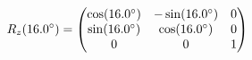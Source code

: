 \documentclass[preview]{standalone}
\begin{document}
\begin{align*}
\special{dvisvgm:raw <g id='unique000'>}R_z(16.0^\circ) = \begin{pmatrix} \cos(16.0^\circ) & -\sin(16.0^\circ) & 0 \\ \sin(16.0^\circ) & \cos(16.0^\circ) & 0 \\ 0 & 0 & 1 \end{pmatrix}\special{dvisvgm:raw </g>}
\end{align*}
\end{document}
